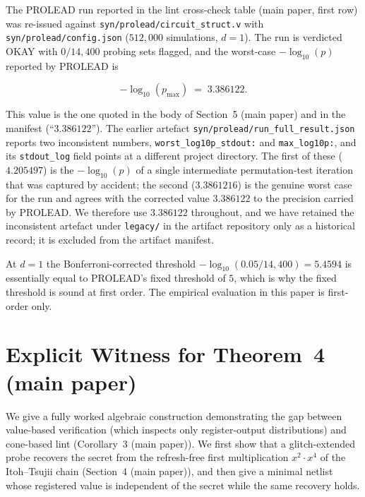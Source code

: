 \documentclass[journal,onecolumn]{IEEEtran}
\begin{document}
The PROLEAD run reported in
the lint cross-check table (main paper, first row) was
re-issued against
\texttt{syn/\allowbreak{}prolead/\allowbreak{}circuit\_\allowbreak{}struct.v} with
\texttt{syn/\allowbreak{}prolead/\allowbreak{}config.json} ($512{,}000$ simulations,
$d = 1$).  The run is verdicted OKAY with $0 / 14{,}400$ probing
sets flagged, and the worst-case
$-\log_{10}(p)$ reported by PROLEAD is

\[
-\log_{10}(p_{\max}) \;=\; 3.386122.
\]

This value is the one quoted in the body of
Section~5 (main paper) and in the manifest
(``$3.386122$'').  The earlier artefact
\texttt{syn/\allowbreak{}prolead/\allowbreak{}run\_\allowbreak{}full\_\allowbreak{}result.json} reports two
inconsistent numbers, \texttt{worst\_\allowbreak{}log10p\_\allowbreak{}stdout:}
and \texttt{max\_\allowbreak{}log10p:}, and its
\texttt{stdout\_\allowbreak{}log} field points at a different project
directory.  The first of these ($4.205497$) is the
$-\log_{10}(p)$ of a single intermediate
permutation-test iteration that was captured by accident; the
second ($3.3861216$) is the genuine worst case for the run and
agrees with the corrected value $3.386122$ to the precision
carried by PROLEAD.  We therefore use $3.386122$ throughout,
and we have retained the inconsistent artefact under
\texttt{legacy/\allowbreak} in the artifact repository only as a historical
record; it is excluded from the artifact manifest.

At $d = 1$ the Bonferroni-corrected threshold
$-\log_{10}(0.05 / 14{,}400) = 5.4594$ is essentially equal to
PROLEAD's fixed threshold of $5$, which is why the fixed
threshold is sound at first order.  The empirical evaluation in this paper is first-order only.

\section{Explicit Witness for Theorem~4 (main paper)}
\label{app:witness}

We give a fully worked algebraic construction demonstrating the gap
between value-based verification (which inspects only
register-output distributions) and cone-based lint
(Corollary~3 (main paper)). We first show that a glitch-extended probe
recovers the secret from the refresh-free first multiplication
$x^{2}\!\cdot\!x^{4}$ of the Itoh--Tsujii chain (Section~4 (main
paper)), and then give a minimal netlist whose registered value is
independent of the secret while the same recovery holds.
\end{document}
